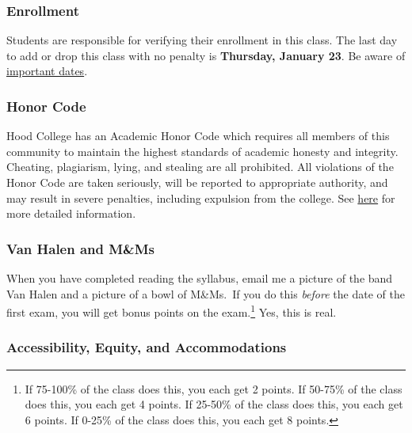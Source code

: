\documentclass{article}
\begin{document}
\hypertarget{enrollment}{%
\subsubsection{Enrollment}\label{enrollment}}

Students are responsible for verifying their enrollment in this class.
The last day to add or drop this class with no penalty is
\textbf{Thursday, January 23}. Be aware of
\href{https://www.hood.edu/offices-services/registrars-office/academic-calendar}{important
dates}.

\hypertarget{honor-code}{%
\subsubsection{Honor Code}\label{honor-code}}

Hood College has an Academic Honor Code which requires all members of
this community to maintain the highest standards of academic honesty and
integrity. Cheating, plagiarism, lying, and stealing are all prohibited.
All violations of the Honor Code are taken seriously, will be reported
to appropriate authority, and may result in severe penalties, including
expulsion from the college. See
\href{http://hood.smartcatalogiq.com/en/2016-2017/Catalog/The-Spirit-of-Hood/The-Academic-Honor-Code-and-Code-of-Conduct}{here}
for more detailed information.

\hypertarget{van-halen-and-mms}{%
\subsubsection{Van Halen and M\&Ms}\label{van-halen-and-mms}}

When you have completed reading the syllabus, email me a picture of the
band Van Halen and a picture of a bowl of M\&Ms.~If you do this
\emph{before} the date of the first exam, you will get bonus points on
the exam.\footnote{If 75-100\% of the class does this, you each get 2
  points. If 50-75\% of the class does this, you each get 4 points. If
  25-50\% of the class does this, you each get 6 points. If 0-25\% of
  the class does this, you each get 8 points.} Yes, this is real.

\hypertarget{accessibility-equity-and-accommodations}{%
\subsubsection{Accessibility, Equity, and
Accommodations}\label{accessibility-equity-and-accommodations}}
\end{document}
